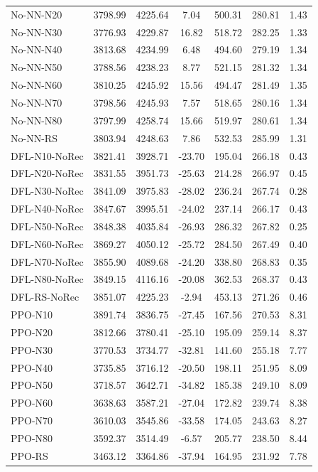 \begin{table}[h]
\begin{tabular}{lcccccc}
No-NN-N20 & 3798.99 & 4225.64 & 7.04 & 500.31 & 280.81 & 1.43 \\
No-NN-N30 & 3776.93 & 4229.87 & 16.82 & 518.72 & 282.25 & 1.33 \\
No-NN-N40 & 3813.68 & 4234.99 & 6.48 & 494.60 & 279.19 & 1.34 \\
No-NN-N50 & 3788.56 & 4238.23 & 8.77 & 521.15 & 281.32 & 1.34 \\
No-NN-N60 & 3810.25 & 4245.92 & 15.56 & 494.47 & 281.49 & 1.35 \\
No-NN-N70 & 3798.56 & 4245.93 & 7.57 & 518.65 & 280.16 & 1.34 \\
No-NN-N80 & 3797.99 & 4258.74 & 15.66 & 519.97 & 280.61 & 1.34 \\
No-NN-RS & 3803.94 & 4248.63 & 7.86 & 532.53 & 285.99 & 1.31 \\
\midrule
DFL-N10-NoRec & 3821.41 & 3928.71 & -23.70 & 195.04 & 266.18 & 0.43 \\
DFL-N20-NoRec & 3831.55 & 3951.73 & -25.63 & 214.28 & 266.97 & 0.45 \\
DFL-N30-NoRec & 3841.09 & 3975.83 & -28.02 & 236.24 & 267.74 & 0.28 \\
DFL-N40-NoRec & 3847.67 & 3995.51 & -24.02 & 237.14 & 266.17 & 0.43 \\
DFL-N50-NoRec & 3848.38 & 4035.84 & -26.93 & 286.32 & 267.82 & 0.25 \\
DFL-N60-NoRec & 3869.27 & 4050.12 & -25.72 & 284.50 & 267.49 & 0.40 \\
DFL-N70-NoRec & 3855.90 & 4089.68 & -24.20 & 338.80 & 268.83 & 0.35 \\
DFL-N80-NoRec & 3849.15 & 4116.16 & -20.08 & 362.53 & 268.37 & 0.43 \\
DFL-RS-NoRec & 3851.07 & 4225.23 & -2.94 & 453.13 & 271.26 & 0.46 \\
\midrule
PPO-N10 & 3891.74 & 3836.75 & -27.45 & 167.56 & 270.53 & 8.31 \\
PPO-N20 & 3812.66 & 3780.41 & -25.10 & 195.09 & 259.14 & 8.37 \\
PPO-N30 & 3770.53 & 3734.77 & -32.81 & 141.60 & 255.18 & 7.77 \\
PPO-N40 & 3735.85 & 3716.12 & -20.50 & 198.11 & 251.95 & 8.09 \\
PPO-N50 & 3718.57 & 3642.71 & -34.82 & 185.38 & 249.10 & 8.09 \\
PPO-N60 & 3638.63 & 3587.21 & -27.04 & 172.82 & 239.74 & 8.38 \\
PPO-N70 & 3610.03 & 3545.86 & -33.58 & 174.05 & 243.63 & 8.27 \\
PPO-N80 & 3592.37 & 3514.49 & -6.57 & 205.77 & 238.50 & 8.44 \\
PPO-RS & 3463.12 & 3364.86 & -37.94 & 164.95 & 231.92 & 7.78 \\
\bottomrule
\end{tabular}
\end{table}
